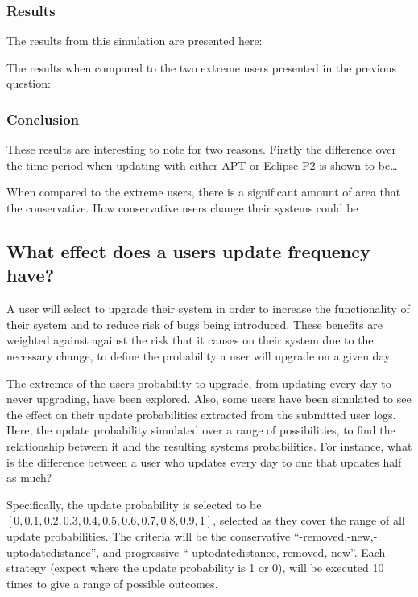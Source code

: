 \subsubsection{Results}
The results from this simulation are presented here:

The results when compared to the two extreme users presented in the previous question:

\subsubsection{Conclusion}
These results are interesting to note for two reasons. 
Firstly the difference over the time period when updating with either APT or Eclipse P2 is shown to be\ldots

When compared to the extreme users, there is a significant amount of area that the conservative.
How conservative users change their systems could be 

\subsection{What effect does a users update frequency have?}
A user will select to upgrade their system in order to increase the functionality of their system and to reduce risk of bugs being introduced.
These benefits are weighted against against the risk that it causes on their system due to the necessary change, to define the probability a user will upgrade on a given day.

The extremes of the users probability to upgrade, from updating every day to never upgrading, have been explored.
Also, some users have been simulated to see the effect on their update probabilities extracted from the submitted user logs.
Here, the update probability simulated over a range of possibilities, to find the relationship between it and the resulting systems probabilities.
For instance, what is the difference between a user who updates every day to one that updates half as much?

Specifically, the update probability is selected to be $[0,0.1,0.2,0.3,0.4,0.5,0.6,0.7,0.8,0.9,1]$,
selected as they cover the range of all update probabilities.  
The criteria will be the conservative ``-removed,-new,-uptodatedistance'', and progressive ``-uptodatedistance,-removed,-new''.
Each strategy (expect where the update probability is 1 or 0), will be executed 10 times to give a range of possible outcomes.

